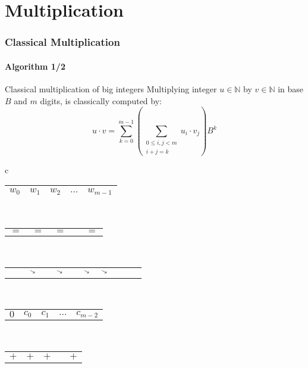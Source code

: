 \section{Multiplication}
\begin{frame}[fragile]
  \frametitle{Classical Multiplication}
  \framesubtitle{Algorithm 1/2}
  \begin{block}{Classical multiplication of big integers}
    \scriptsize
  Multiplying integer $u\in \mathbb{N}$ by $v \in \mathbb{N}$  in base $B$ and $m$ digits, is classically computed by:\vspace*{-0.8em}
\begin{equation}
u \cdot v = \sum_{k=0}^{m-1} \left( \sum_{\substack{0\leq i,j < m\\i+j=k}}u_i\cdot v_j \right)B^{k}
\end{equation}
\end{block}\phantom{~}\vspace{-1.8em}
\begin{center}\scriptsize
  \begin{tabular}{c}
    \begin{tabular}{|C{0.8cm}|C{0.8cm}|C{0.8cm}|C{0.5cm}|C{0.8cm}|}
      \hline
      $w_0$ & $w_1$ & $w_2$ & $\ldots$ & $w_{m-1}$ \\
      \hline
    \end{tabular}\\
    \begin{tabular}{C{0.8cm}C{0.8cm}C{0.8cm}C{0.5cm}C{0.8cm}}
      $=$ & $=$ & $=$ &  & $=$
    \end{tabular}\\[-2ex]
    \begin{tabular}{C{0.2cm}C{0.2cm}C{0.2cm}C{0.2cm}C{0.2cm}C{0cm}C{0.7cm}C{0.2cm}C{0.2cm}C{0.2cm}C{0.2cm}}
      & & $\diagonalarrowdown$ & & $\diagonalarrowdown$ & & $\diagonalarrowdown$ & $\diagonalarrowdown$ & &
    \end{tabular}\\[-1.4ex]
    \begin{tabular}{C{0.8cm}C{0.8cm}C{0.8cm}C{0.5cm}C{0.8cm}}
      $0$ & $c_0$ & $c_1$ & $\ldots$ & $c_{m-2}$
    \end{tabular}\\[-0.7ex]
    \begin{tabular}{C{0.8cm}C{0.8cm}C{0.8cm}C{0.5cm}C{0.8cm}}
      $+$ & $+$ & $+$ &  & $+$
    \end{tabular}\\[-0.7ex]
    \begin{tabular}{C{0.8cm}C{0.8cm}C{0.8cm}C{0.5cm}C{0.8cm}}

\end{tabular}
\end{tabular}
\end{center}
\end{frame}
